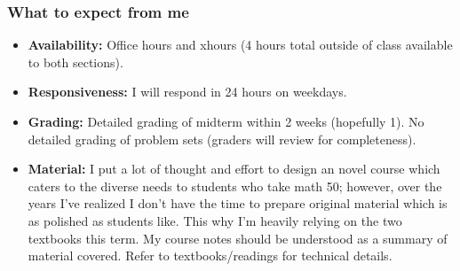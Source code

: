 \documentclass[serif,mathserif]{beamer}
\begin{document}
\begin{frame} 
\frametitle{What to expect from me}

\begin{itemize}
\item {\bf Availability:} Office hours and xhours (4 hours total outside of class available to both sections).
\item {\bf Responsiveness:} I will respond in 24 hours on weekdays. 
\item {\bf Grading:} Detailed grading of midterm within 2 weeks (hopefully 1). No detailed grading of problem sets (graders will review for completeness). 
\item {\bf Material:} I put a lot of thought and effort to design an novel course which caters to the diverse needs to students who take math 50; however, over the years I've realized I don't have the time to prepare original material which is as polished as students like. This why I'm heavily relying on the two textbooks this term.   My course notes should be understood as a summary of material covered. Refer to textbooks/readings for technical details. 
\end{itemize}


\end{frame}
\end{document}
